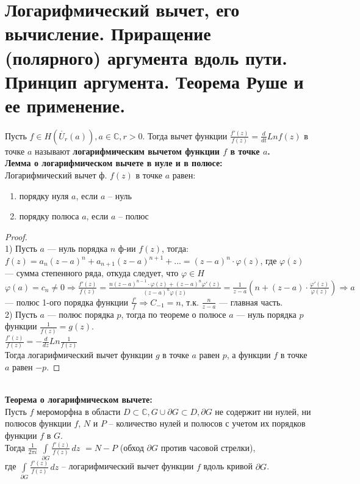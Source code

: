 \newpage
\section{Логарифмический вычет, его вычисление. Приращение (полярного) аргумента вдоль пути. Принцип аргумента. Теорема Руше и ее применение.}

Пусть $f \in H(\mathring{U_r}(a)), a \in \mathbb{C}, r > 0$. Тогда вычет функции $\frac{f'(z)}{f(z)} = \frac{d}{dt}Lnf(z)$ в точке $a$ называют \textbf{логарифмическим вычетом функции $f$ в точке $a$.}\\[2mm]

\textbf{Лемма о логарифмическом вычете в нуле и в полюсе:}\\[2mm]
Логарифмический вычет ф. $f(z)$ в точке $a$ равен:
\begin{enumerate}
    \item порядку нуля $a$, если $a$ -- нуль
    \item порядку полюса $a$, если $a$ -- полюс
\end{enumerate}

\begin{proof}
    \ \\
    1) Пусть $a$ --- нуль порядка $n$ ф-ии $f(z)$, тогда:\\
    $f(z) =a_n(z-a)^n + a_{n+1}(z-a)^{n+1}+...=(z-a)^n\cdot \varphi(z)$, где
    $\varphi(z)$ --- сумма степенного ряда, откуда следует, что $\varphi \in H$\\[2mm]
    $\varphi(a)=c_n\neq0\Rightarrow \frac{f'(z)}{f(z)}=\frac{n(z-a)^{n-1}\cdot \varphi(z)+(z-a)^{n}\varphi'(z)}{(z-a)^n \varphi(z)}=\frac{1}{z-a}\left(n+(z-a)\cdot \frac{\varphi'(z)}{\varphi(z)}\right) \Rightarrow a$ --- полюс 1-ого порядка функции $\frac{f'}{f} \Rightarrow C_{-1}=n$, т.к. $\frac{n}{z-a}$ --- главная часть.\\[2mm]
    2) Пусть $a$ --- полюс порядка $p$, тогда по теореме о полюсе $a$ --- нуль порядка $p$ функции $\frac{1}{f(z)}=g(z)$.\\
    $\frac{f'(z)}{f(z)} = -\frac{d}{dz} Ln\frac{1}{f(z)}$\\
    Тогда логарифмический вычет функции $g$ в точке $a$ равен $p$, а функции $f$ в точке $a$ равен $-p$.
\end{proof}
\ \\

\textbf{Теорема о логарифмическом вычете:}\\[2mm]
Пусть $f$ мероморфна в области $D \subset \mathbb{C}, G \cup \partial G \subset D, \partial G$ не содержит ни нулей, ни полюсов функции $f$, $N$ и $P$ -- количество нулей и полюсов с учетом их порядков функции $f$ в $G$.\\
Тогда $\frac{1}{2\pi i}$ \(\int\limits_{\partial G} \frac{f'(z)}{f(z)}\, dz\) $= N - P$ (обход $\partial G$ против часовой стрелки),\\
где \(\int\limits_{\partial G} \frac{f'(z)}{f(z)}\, dz\) -- логарифмический вычет функции $f$ вдоль кривой $\partial G$.

